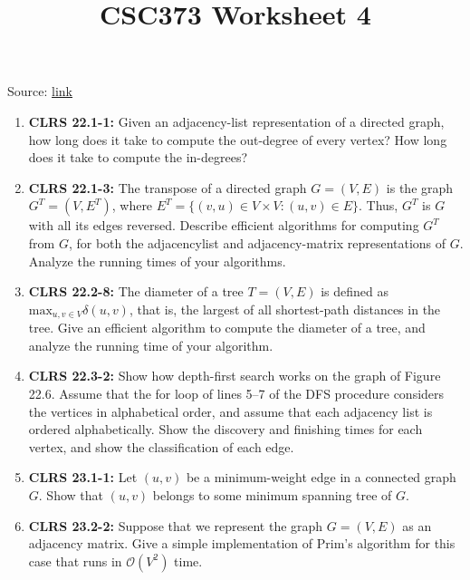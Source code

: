 \documentclass[12pt]{article}
\begin{document}
\title{CSC373 Worksheet 4}
\maketitle

\bigskip

Source: \href{http://www.cs.toronto.edu/~denisp/csc373/material.html}{link}

\bigskip

\begin{enumerate}[1.]
    \item \textbf{CLRS 22.1-1:} Given an adjacency-list representation of a directed graph, how long does it take
    to compute the out-degree of every vertex? How long does it take to compute the in-degrees?

    \item \textbf{CLRS 22.1-3:} The transpose of a directed graph $G = (V,E)$ is the graph $G^T = (V,E^T)$, where
    $E^T = \{(v,u) \in V \times V : (u,v) \in E\}$. Thus, $G^T$ is $G$ with all its edges reversed.
    Describe efficient algorithms for computing $G^T$ from $G$, for both the adjacencylist
    and adjacency-matrix representations of $G$. Analyze the running times of your
    algorithms.

    \item \textbf{CLRS 22.2-8:} The diameter of a tree $T = (V,E)$ is defined as $\text{max}_{u,v \in V} \delta(u,v)$, that is, the
    largest of all shortest-path distances in the tree. Give an efficient algorithm to
    compute the diameter of a tree, and analyze the running time of your algorithm.

    \item \textbf{CLRS 22.3-2:} Show how depth-first search works on the graph of Figure 22.6. Assume that the
    for loop of lines 5–7 of the DFS procedure considers the vertices in alphabetical
    order, and assume that each adjacency list is ordered alphabetically. Show the
    discovery and finishing times for each vertex, and show the classification of each
    edge.

    \item \textbf{CLRS 23.1-1:} Let $(u,v)$ be a minimum-weight edge in a connected graph $G$. Show that $(u,v)$
    belongs to some minimum spanning tree of $G$.

    \item \textbf{CLRS 23.2-2:} Suppose that we represent the graph $G = (V,E)$ as an adjacency matrix. Give a
    simple implementation of Prim’s algorithm for this case that runs in $\mathcal{O}(V^2)$ time.


\end{enumerate}
\end{document}
